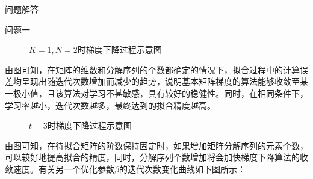 \documentclass[11pt]{article}
\begin{document}
\begin{section}{问题解答}
\begin{subsection}{问题一}
\begin{figure}[H]
     \label{fig:$K=1,N=2$时梯度下降过程示意图}
     \caption{$K=1,N=2$时梯度下降过程示意图}
   \end{figure}
   由图可知，在矩阵的维数和分解序列的个数都确定的情况下，拟合过程中的计算误差均呈现出随迭代次数增加而减少的趋势，说明基本矩阵梯度的算法能够收敛至某一极小值，且该算法对学习不甚敏感，具有较好的稳健性。同时，在相同条件下，学习率越小，迭代次数越多，最终达到的拟合精度越高。\par
   \begin{figure}[H]
     \centering
     \label{fig:$t=3$时梯度下降过程示意图}
     \caption{$t=3$时梯度下降过程示意图}
   \end{figure}
   由图可知，在待拟合矩阵的阶数保持固定时，如果增加矩阵分解序列的元素个数，可以较好地提高拟合的精度，同时，分解序列个数增加将会加快梯度下降算法的收敛速度。有关另一个优化参数$\beta$的迭代次数变化曲线如下图所示：\par

\end{subsection}
\end{section}
\end{document}
